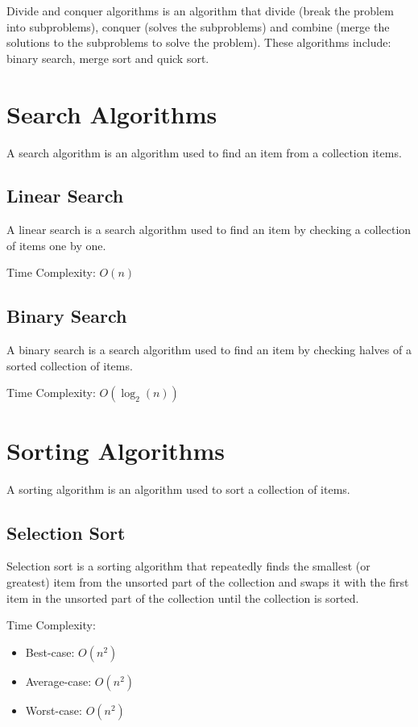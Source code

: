 Divide and conquer algorithms is an algorithm that divide (break the problem into subproblems), conquer (solves the subproblems) and combine (merge the solutions to the subproblems to solve the problem). These algorithms include: binary search, merge sort and quick sort.

\section{Search Algorithms}

A search algorithm is an algorithm used to find an item from a collection items.

\subsection{Linear Search}

A linear search is a search algorithm used to find an item by checking a collection of items one by one.

Time Complexity: $O(n)$

\subsection{Binary Search}

A binary search is a search algorithm used to find an item by checking halves of a sorted collection of items.

Time Complexity: $O(\log_{2}(n))$

\section{Sorting Algorithms}

A sorting algorithm is an algorithm used to sort a collection of items.

\subsection{Selection Sort}

Selection sort is a sorting algorithm that repeatedly finds the smallest (or greatest) item from the unsorted part of the collection and swaps it with the first item in the unsorted part of the collection until the collection is sorted.

Time Complexity:

\begin{itemize}
  \item Best-case: $O(n^2)$
  \item Average-case: $O(n^2)$
  \item Worst-case: $O(n^2)$
\end{itemize}

